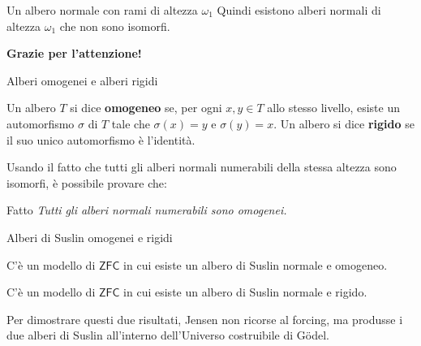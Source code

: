 \documentclass{beamer}
\theoremstyle{num.custom-title}
\theoremstyle{custom-title}
\newcommand{\ZFC}{\ensuremath{\mathsf{ZFC}}\xspace}
\renewcommand{\emph}[1]{\textbf{#1}}
\begin{document}
\begin{frame}{Un albero normale con rami di altezza $\omega_1$}
Quindi esistono alberi normali di altezza $\omega_1$ che non sono isomorfi.
\end{frame}


\begin{frame}[plain]
\begin{center}
\Large \textbf{Grazie per l'attenzione!}
\end{center}
\end{frame}


\begin{frame}{Alberi omogenei e alberi rigidi}

\begin{definition}
Un albero $T$ si dice \emph{omogeneo} se, per ogni $x,y \in T$ allo stesso livello, esiste un automorfismo $\sigma$ di $T$ tale che $\sigma(x)=y$ e $\sigma(y)=x$. Un albero si dice \emph{rigido} se il suo unico automorfismo è l'identità.
\end{definition}

\pause

Usando il fatto che tutti gli alberi normali numerabili della stessa altezza sono isomorfi, è possibile provare che:

\begin{block}{Fatto}
\textit{Tutti gli alberi normali numerabili sono omogenei.}
\end{block}

\end{frame}


\begin{frame}{Alberi di Suslin omogenei e rigidi}

\begin{theorem}[Jensen, 1971]
C'è un modello di \ZFC in cui esiste un albero di Suslin normale e omogeneo.
\end{theorem}

\pause

\begin{theorem}[Jensen, 1971]
C'è un modello di \ZFC in cui esiste un albero di Suslin normale e rigido.
\end{theorem}

\pause

Per dimostrare questi due risultati, Jensen non ricorse al forcing, ma produsse i due alberi di Suslin all'interno dell'Universo costruibile di Gödel.

\end{frame}
\end{document}
